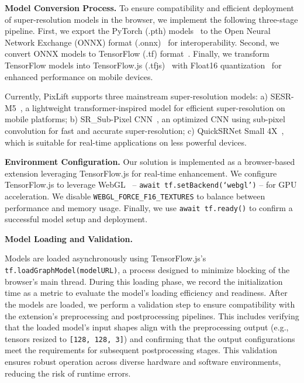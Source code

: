 \documentclass[acmsmall]{acmart}
\newcommand{\tool}{{PixLift}\xspace}
\begin{document}
\vspace{0.05in}
\noindent
\textbf{Model Conversion Process.} To ensure compatibility and efficient deployment of super-resolution models in the browser, we implement the following three-stage pipeline. First, we export the PyTorch (.pth) models~\cite{pytorch} to the Open Neural Network Exchange (ONNX) format (.onnx)~\cite{onnx} for interoperability. Second, we convert ONNX models to TensorFlow (.tf) format~\cite{tensorflowjs}. Finally, we transform TensorFlow models into TensorFlow.js (.tfjs)~\cite{tensorflowjs} with Float16 quantization~\cite{tensorflow_quantization_blog} for enhanced performance on mobile devices.

Currently, \tool supports three mainstream super-resolution models: a) SESR-M5~\cite{sesrm5}, a lightweight transformer-inspired model for efficient super-resolution on mobile platforms; b) SR\_Sub-Pixel CNN~\cite{srsubpixelcnn}, an optimized CNN using sub-pixel convolution for fast and accurate super-resolution; c) QuickSRNet Small 4X~\cite{quicksrnet}, which is suitable for real-time applications on less powerful devices.

\vspace{0.05in}
\noindent
\textbf{Environment Configuration.} Our solution is implemented as a browser-based extension leveraging TensorFlow.js for real-time enhancement. We configure TensorFlow.js to leverage WebGL~\cite{webgl} -- \texttt{await tf.setBackend(`webgl')} -- for GPU acceleration. We disable  \texttt{WEBGL\_FORCE\_F16\_TEXTURES} to balance  between performance and memory usage. Finally, we use \texttt{await tf.ready()} to confirm a successful model setup and deployment. 

\vspace{0.05in}
\noindent
\textbf{Model Loading and Validation.}

Models are loaded asynchronously using TensorFlow.js's\\ \texttt{tf.loadGraphModel(modelURL)}, a process designed to minimize blocking of the browser's main thread. During this loading phase, we record the initialization time as a metric to evaluate the model's loading efficiency and readiness. After the models are loaded, we perform a validation step to ensure compatibility with the extension's preprocessing and postprocessing pipelines. This includes verifying that the loaded model's input shapes align with the preprocessing output (e.g., tensors resized to \texttt{[128, 128, 3]}) and confirming that the output configurations meet the requirements for subsequent postprocessing stages. This validation ensures robust operation across diverse hardware and software environments, reducing the risk of runtime errors.
\end{document}
